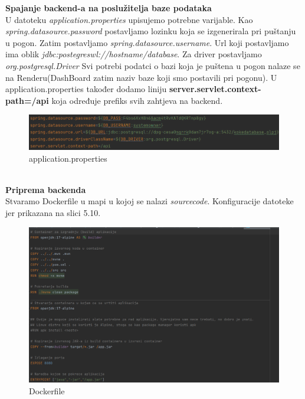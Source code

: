            \textbf{Spajanje backend-a na poslužitelja baze podataka}\\
           U datoteku \textit{application.properties} upisujemo potrebne varijable. Kao \textit{spring.datasource.password} postavljamo lozinku koja se izgenerirala pri puštanju u pogon. Zatim postavljamo \textit{spring.datasource.username}. Url koji postavljamo ima oblik \textit{jdbc:postegreswl://hostname/database}. Za driver postavljamo \textit{org.postgresql.Driver}  Svi potrebi podatci o bazi koja je puštena u pogon nalaze se na Renderu(DashBoard 
            zatim naziv baze koji smo postavili pri pogonu). 
             U application.properties također dodamo liniju \textbf{server.servlet.context-path=/api} koja određuje prefiks svih zahtjeva na backend.
            \begin{figure}[H]
                 \includegraphics[width=\textwidth]{slike/application-properties.png}
                \centering
                 \caption{application.properties}
                 \label{fig:application.properties}
                 \end{figure}\\

        \textbf{Priprema backenda}\\
            Stvaramo Dockerfile u mapi u kojoj se nalazi \textit{sourcecode}. Konfiguracije datoteke jer prikazana na slici 5.10.
             \begin{figure}[H]
                 \includegraphics[scale = 0.5]{slike/Dockerfile.png}
                \centering
                 \caption{Dockerfile}
                 \label{fig:dockerfile}
                 \end{figure}\\\\

